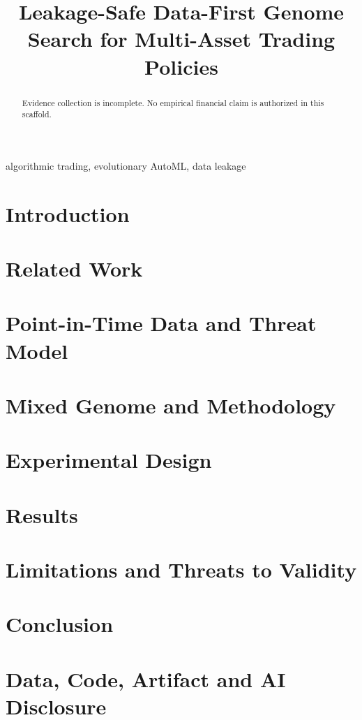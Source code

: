 \documentclass[conference]{IEEEtran}
\title{Leakage-Safe Data-First Genome Search for Multi-Asset Trading Policies}
\author{\IEEEauthorblockN{Harvey}}
\begin{document}
\maketitle
\begin{abstract}
Evidence collection is incomplete. No empirical financial claim is authorized in this scaffold.
\end{abstract}
\begin{IEEEkeywords}
algorithmic trading, evolutionary AutoML, data leakage
\end{IEEEkeywords}
\section{Introduction}
\section{Related Work}
\section{Point-in-Time Data and Threat Model}
\section{Mixed Genome and Methodology}
\section{Experimental Design}
\section{Results}
\section{Limitations and Threats to Validity}
\section{Conclusion}
\section*{Data, Code, Artifact and AI Disclosure}


\end{document}
